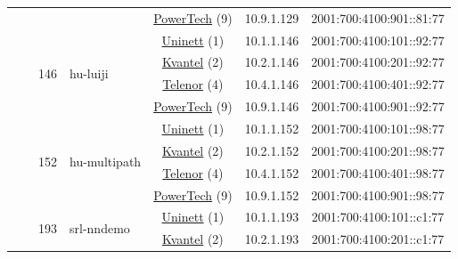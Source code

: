 \begin{small}
\begin{center}
\begin{longtable}{|c|c|c|c|c|c|c|c|}
  &  &  &  & \multicolumn{2}{|c|}{\tiny{\href{http://www.powertech.no}{PowerTech} (9)}} & \tiny{10.9.1.129} & \tiny{2001:700:4100:901::81:77} \\* \cline{3-3}\cline{4-4}\cline{5-5}\cline{6-6}\cline{7-7}\cline{8-8}
  &  & \multirow{4}{*}{\tiny{146}} & \multicolumn{1}{|l|}{\multirow{4}{*}{\tiny{hu-luiji}}} & \multicolumn{2}{|c|}{\tiny{\href{https://www.uninett.no}{Uninett} (1)}} & \tiny{10.1.1.146} & \tiny{2001:700:4100:101::92:77} \\* \cline{5-5}\cline{6-6}\cline{7-7}\cline{8-8}
  &  &  &  & \multicolumn{2}{|c|}{\tiny{\href{http://kvantel.no}{Kvantel} (2)}} & \tiny{10.2.1.146} & \tiny{2001:700:4100:201::92:77} \\* \cline{5-5}\cline{6-6}\cline{7-7}\cline{8-8}
  &  &  &  & \multicolumn{2}{|c|}{\tiny{\href{https://www.telenor.no}{Telenor} (4)}} & \tiny{10.4.1.146} & \tiny{2001:700:4100:401::92:77} \\* \cline{5-5}\cline{6-6}\cline{7-7}\cline{8-8}
  &  &  &  & \multicolumn{2}{|c|}{\tiny{\href{http://www.powertech.no}{PowerTech} (9)}} & \tiny{10.9.1.146} & \tiny{2001:700:4100:901::92:77} \\* \cline{3-3}\cline{4-4}\cline{5-5}\cline{6-6}\cline{7-7}\cline{8-8}
  &  & \multirow{4}{*}{\tiny{152}} & \multicolumn{1}{|l|}{\multirow{4}{*}{\tiny{hu-multipath}}} & \multicolumn{2}{|c|}{\tiny{\href{https://www.uninett.no}{Uninett} (1)}} & \tiny{10.1.1.152} & \tiny{2001:700:4100:101::98:77} \\* \cline{5-5}\cline{6-6}\cline{7-7}\cline{8-8}
  &  &  &  & \multicolumn{2}{|c|}{\tiny{\href{http://kvantel.no}{Kvantel} (2)}} & \tiny{10.2.1.152} & \tiny{2001:700:4100:201::98:77} \\* \cline{5-5}\cline{6-6}\cline{7-7}\cline{8-8}
  &  &  &  & \multicolumn{2}{|c|}{\tiny{\href{https://www.telenor.no}{Telenor} (4)}} & \tiny{10.4.1.152} & \tiny{2001:700:4100:401::98:77} \\* \cline{5-5}\cline{6-6}\cline{7-7}\cline{8-8}
  &  &  &  & \multicolumn{2}{|c|}{\tiny{\href{http://www.powertech.no}{PowerTech} (9)}} & \tiny{10.9.1.152} & \tiny{2001:700:4100:901::98:77} \\* \cline{3-3}\cline{4-4}\cline{5-5}\cline{6-6}\cline{7-7}\cline{8-8}
  &  & \multirow{4}{*}{\tiny{193}} & \multicolumn{1}{|l|}{\multirow{4}{*}{\tiny{srl-nndemo}}} & \multicolumn{2}{|c|}{\tiny{\href{https://www.uninett.no}{Uninett} (1)}} & \tiny{10.1.1.193} & \tiny{2001:700:4100:101::c1:77} \\* \cline{5-5}\cline{6-6}\cline{7-7}\cline{8-8}
  &  &  &  & \multicolumn{2}{|c|}{\tiny{\href{http://kvantel.no}{Kvantel} (2)}} & \tiny{10.2.1.193} & \tiny{2001:700:4100:201::c1:77} \\* \cline{5-5}\cline{6-6}\cline{7-7}\cline{8-8}

\end{longtable}
\end{center}
\end{small}
